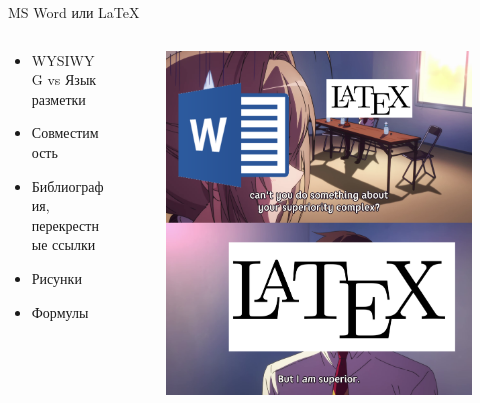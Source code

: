 \documentclass[10pt,aspectratio=169]{beamer}
\begin{document}
    \begin{frame}{MS Word или \LaTeX}
    	\begin{columns}
	    	\begin{column}{0.5\textwidth}
	    		\begin{itemize}
	    			\item WYSIWYG vs Язык разметки
	    			\item Совместимость
	    			\item Библиография, перекрестные ссылки
	    			\item Рисунки
	    			\item Формулы
	    		\end{itemize}
	    	\end{column}
	    	\begin{column}{0.5\textwidth}
	    		\begin{figure}[h!]
	    			\centering
	    			\includegraphics[scale=0.08]{img/word-latex.png}
	    		\end{figure}
	    	\end{column}
    	\end{columns}
    \end{frame}
    
\end{document}
